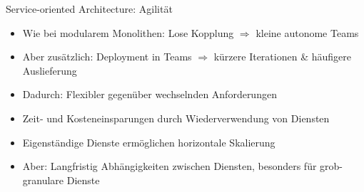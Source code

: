 \begin{frame}{Service-oriented Architecture: Agilität}
    \begin{itemize}
        \item Wie bei modularem Monolithen: Lose Kopplung $\Rightarrow$ kleine autonome Teams
        \item Aber zusätzlich: Deployment in Teams $\Rightarrow$ kürzere Iterationen \& häufigere Auslieferung
        \item Dadurch: Flexibler gegenüber wechselnden Anforderungen
        \item Zeit- und Kosteneinsparungen durch Wiederverwendung von Diensten
        \item Eigenständige Dienste ermöglichen horizontale Skalierung
        \item Aber: Langfristig Abhängigkeiten zwischen Diensten, besonders für grob-granulare Dienste
    \end{itemize}
\end{frame}